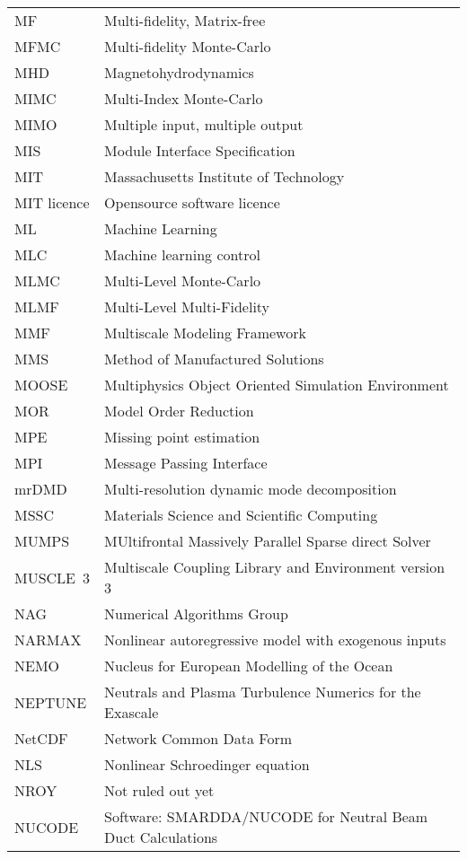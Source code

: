 \begin{longtable}{|p{4.0cm}|p{12.0cm}|}
MF & Multi-fidelity, Matrix-free \\
MFMC & Multi-fidelity Monte-Carlo \\
MHD & Magnetohydrodynamics \\
MIMC & Multi-Index Monte-Carlo \\
MIMO  & Multiple input, multiple output \\
MIS & Module Interface Specification \\
MIT & Massachusetts Institute of Technology \\
MIT licence& Opensource software licence~\cite{MITlicense} \\
ML & Machine Learning \\
MLC  & Machine learning control \\
MLMC & Multi-Level Monte-Carlo \\
MLMF & Multi-Level Multi-Fidelity\\
MMF & Multiscale Modeling Framework\\
MMS & Method of Manufactured Solutions \\
MOOSE & Multiphysics Object Oriented Simulation Environment\\
MOR & Model Order Reduction\\
MPE  & Missing point estimation \\
MPI & Message Passing Interface \\
mrDMD  & Multi-resolution dynamic mode decomposition \\
MSSC & Materials Science and Scientific Computing\\
MUMPS & MUltifrontal Massively Parallel Sparse direct Solver\\
MUSCLE~3 & Multiscale Coupling Library and Environment version 3\\
NAG & Numerical Algorithms Group \\
NARMAX  & Nonlinear autoregressive model with exogenous inputs \\
NEMO & Nucleus for European Modelling of the Ocean\\
NEPTUNE & Neutrals and Plasma Turbulence Numerics for the Exascale \\
NetCDF  &  Network Common Data Form \\
NLS  & Nonlinear Schroedinger equation \\
NROY & Not ruled out yet \\
NUCODE & Software: SMARDDA/NUCODE for Neutral Beam Duct Calculations\\

\end{longtable}
